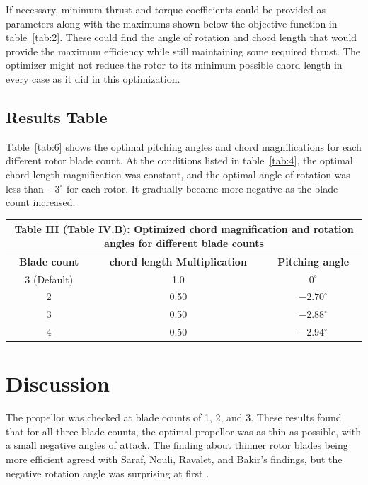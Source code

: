 \documentclass[journal ]{new-aiaa}
\begin{document}
If necessary, minimum thrust and torque coefficients could be provided as parameters along with the maximums shown below the objective function in table~\eqref{tab:2}. These could find the angle of rotation and chord length that would provide the maximum efficiency while still maintaining some required thrust. The optimizer might not reduce the rotor to its minimum possible chord length in every case as it did in this optimization.

\subsection{Results Table}

Table~\eqref{tab:6} shows the optimal pitching angles and chord magnifications for each different rotor blade count. At the conditions listed in table~\eqref{tab:4}, the optimal chord length magnification was constant, and the optimal angle of rotation was less than $-3^{\circ}$ for each rotor. It gradually became more negative as the blade count increased.

\begin{center}
\begin{tabular}{| c | c | c |}
	 \multicolumn{3}{c}{Table III (Table IV.B): Optimized chord magnification and rotation angles for different blade counts}  \\ \hline
  	 \textbf{Blade count} & \textbf{chord length Multiplication} & \textbf{Pitching angle} \\ \hline
  	 3 (Default) & 1.0 & $0^{\circ}$ \\ \hline
  	 2 & 0.50 & $-2.70^{\circ}$ \\ \hline
  	 3 & 0.50 & $-2.88^{\circ}$ \\ \hline
  	 4 & 0.50 & $-2.94^{\circ}$ \\ \hline
\end{tabular}
\label{tab:6}
\end{center}


\section{Discussion}

The propellor was checked at blade counts of 1, 2, and 3. These results found that for all three blade counts, the optimal propellor was as thin as possible, with a small negative angles of attack. The finding about thinner rotor blades being more efficient agreed with Saraf, Nouli, Ravalet, and Bakir's findings, but the negative rotation angle was surprising at first \cite{AxFlFan}.
\end{document}
